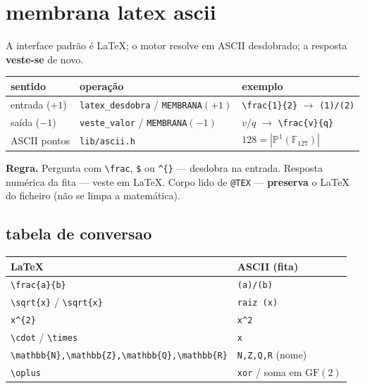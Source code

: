 \documentclass[11pt,a4paper]{article}
\newcommand{\code}[1]{\texttt{\small #1}}
\begin{document}
\section{membrana latex ascii}\label{sec:membrana}
A interface padrão é LaTeX; o motor resolve em ASCII desdobrado; a resposta
\textbf{veste-se} de novo.

\begin{center}\small
\begin{tabular}{@{}lll@{}}
\toprule
sentido & operação & exemplo \\
\midrule
entrada ($+1$) & \code{latex\_desdobra} / \code{MEMBRANA}$(+1)$
  & \verb|\frac{1}{2}| $\to$ \texttt{(1)/(2)} \\
saída ($-1$) & \code{veste\_valor} / \code{MEMBRANA}$(-1)$
  & $v/q$ $\to$ \verb|\frac{v}{q}| \\
ASCII pontos & \code{lib/ascii.h} & $128=|\mathbb{P}^{1}(\mathbb{F}_{127})|$ \\
\bottomrule
\end{tabular}
\end{center}

\noindent\textbf{Regra.} Pergunta com \verb|\frac|, \verb|$| ou \verb|^{}| ---
desdobra na entrada. Resposta numérica da fita --- veste em LaTeX. Corpo lido
de \texttt{@TEX} --- \textbf{preserva} o LaTeX do ficheiro (não se limpa a matemática).

\subsection*{tabela de conversao}
\begin{center}\small
\begin{tabular}{@{}ll@{}}
\toprule
LaTeX & ASCII (fita) \\
\midrule
\verb|\frac{a}{b}| & \texttt{(a)/(b)} \\
\verb|\sqrt{x}| / \verb|\sqrt{x}| & \texttt{raiz (x)} \\
\verb|x^{2}| & \texttt{x\^{}2} \\
\verb|\cdot| / \verb|\times| & \texttt{x} \\
\verb|\mathbb{N},\mathbb{Z},\mathbb{Q},\mathbb{R}| & \texttt{N,Z,Q,R} (nome) \\
\verb|\oplus| & \texttt{xor} / soma em $\mathrm{GF}(2)$ \\
\bottomrule
\end{tabular}
\end{center}
\end{document}
